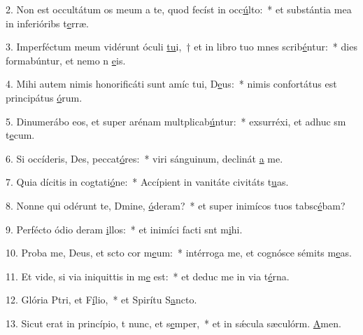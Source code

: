 2. Non est occultátum os meum a te, quod fecíst in occ\uline{ú}lto:~* et substántia mea in inferióribs t\uline{e}rræ.\par 
3. Imperféctum meum vidérunt óculi \uline{tu}i,~† et in libro tuo mnes scrib\uline{é}ntur:~* dies formabúntur, et nemo n \uline{e}is.\par 
4. Mihi autem nimis honorificáti sunt amíc tui, D\uline{e}us:~* nimis confortátus est principátus \uline{ó}rum.\par 
5. Dinumerábo eos, et super arénam multplicab\uline{ú}ntur:~* exsurréxi, et adhuc sm t\uline{e}cum.\par 
6. Si occíderis, Des, peccat\uline{ó}res:~* viri sánguinum, declinát \uline{a} me.\par 
7. Quia dícitis in cogtati\uline{ó}ne:~* Accípient in vanitáte civitáts t\uline{u}as.\par 
8. Nonne qui odérunt te, Dmine, \uline{ó}deram?~* et super inimícos tuos tabsc\uline{é}bam?\par 
9. Perfécto ódio deram \uline{i}llos:~* et inimíci facti snt m\uline{i}hi.\par 
10. Proba me, Deus, et scto cor m\uline{e}um:~* intérroga me, et cognósce sémits m\uline{e}as.\par 
11. Et vide, si via iniquittis in m\uline{e} est:~* et deduc me in via t\uline{é}rna.\par 
12. Glória Ptri, et F\uline{í}lio,~* et Spirítu S\uline{a}ncto.\par 
13. Sicut erat in princípio, t nunc, et s\uline{e}mper,~* et in sǽcula sæculórm. \uline{A}men.\par 
